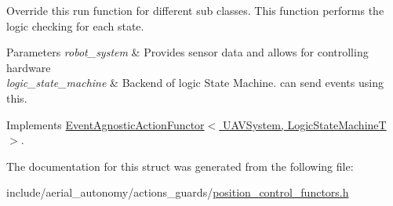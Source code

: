 Override this run function for different sub classes. This function performs the logic checking for each state. 


\begin{DoxyParams}{Parameters}
{\em robot\-\_\-system} & Provides sensor data and allows for controlling hardware \\
\hline
{\em logic\-\_\-state\-\_\-machine} & Backend of logic State Machine. can send events using this. \\
\hline
\end{DoxyParams}


Implements \hyperlink{structEventAgnosticActionFunctor_a53a48938d68370ff2ef262222565ffcf}{Event\-Agnostic\-Action\-Functor$<$ U\-A\-V\-System, Logic\-State\-Machine\-T $>$}.



The documentation for this struct was generated from the following file\-:\begin{DoxyCompactItemize}
\item 
include/aerial\-\_\-autonomy/actions\-\_\-guards/\hyperlink{position__control__functors_8h}{position\-\_\-control\-\_\-functors.\-h}\end{DoxyCompactItemize}
